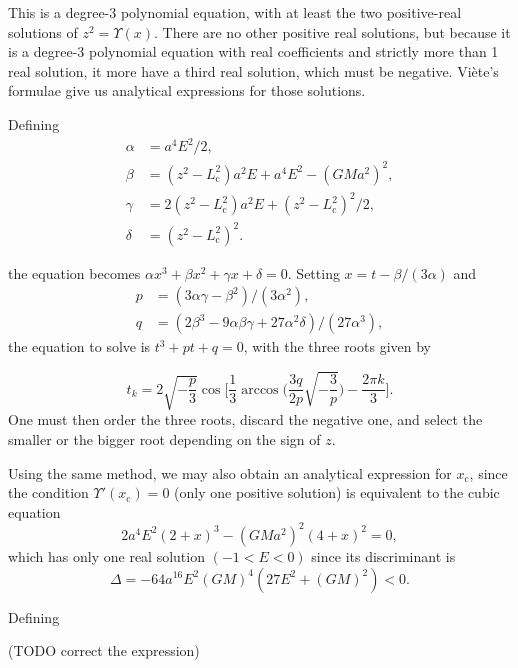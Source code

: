 \documentclass[11pt]{article}
\newcommand{\rc}{\mathrm{c}}
\newcommand{\Lc}{L_{\rc}}
\newcommand{\xc}{x_{\rc}}
\begin{document}
\begin{appendices}
This is a degree-3 polynomial equation, with at least the two positive-real solutions of $z^{2}=\Upsilon(x)$. There are no other positive real solutions, but because it is a degree-3 polynomial equation with real coefficients and strictly more than 1 real solution, it more have a third real solution, which must be negative. Viète's formulae give us analytical expressions for those solutions.

Defining
\begin{align*}
  \alpha &= a^{4}E^{2}/2, \\
  \beta &= (z^{2}-\Lc^{2})a^{2}E+a^{4}E^{2}-(GMa^{2})^{2} ,\\
  \gamma &= 2(z^{2}-\Lc^{2})a^{2}E + (z^{2}-\Lc^{2})^{2}/2 ,\\
  \delta &= (z^{2}-\Lc^{2})^{2} .
\end{align*}

the equation becomes $\alpha x^{3}+\beta x^{2}+\gamma x+\delta = 0$. Setting $x=t-\beta /(3\alpha)$ and
\begin{align*}
  p &= (3\alpha \gamma -\beta^{2})/(3\alpha^{2}), \\
  q &= (2\beta^{3}-9\alpha \beta \gamma+27\alpha^{2}\delta)/(27\alpha^{3}) ,
  \end{align*}
the equation to solve is $t^{3}+pt+q=0$, with the three roots given by

\begin{equation}
  t_{k} = 2\sqrt{-\frac{p}{3}} \cos\bigg[\frac{1}{3}\arccos\bigg(\frac{3q}{2p} \sqrt{-\frac{3}{p}}\bigg)-\frac{2\pi k}{3}\bigg] .
  \label{eq:Viete_formula_varphi(z)}
\end{equation}
One must then order the three roots, discard the negative one, and select the smaller or the bigger root depending on the sign of $z$.

Using the same method, we may also obtain an analytical expression for $\xc$, since the condition $\Upsilon'(\xc)=0$ (only one positive solution) is equivalent to the cubic equation
\begin{equation}
   2a^{4}E^{2}(2+x)^{3} - (GMa^{2})^{2} (4+x)^{2} = 0 ,
  \label{eq:xcPlummer}
\end{equation}
which has only one real solution $(-1<E<0)$ since its discriminant is $$\Delta=-64a^{16}E^{2}(GM)^{4}(27E^{2}+(GM)^{2})<0. $$

Defining

(TODO correct the expression)


\end{appendices}
\end{document}
